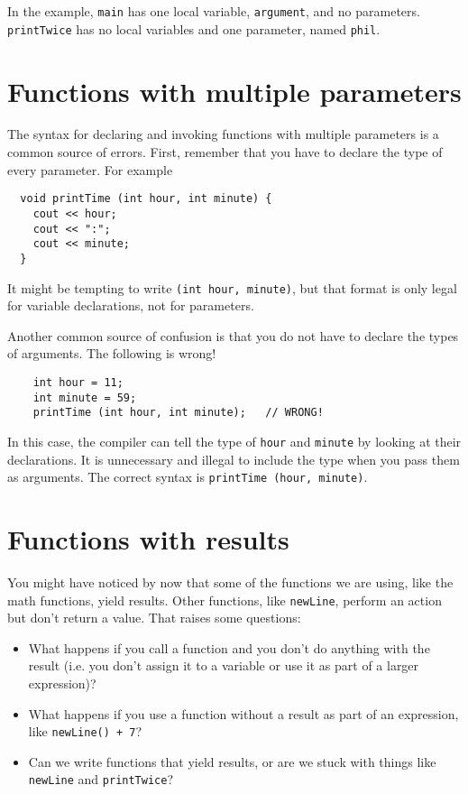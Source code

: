 In the example, {\tt main} has one local variable, {\tt argument}, and
no parameters.  {\tt printTwice} has no local variables and one
parameter, named {\tt phil}.

\section {Functions with multiple parameters}

The syntax for declaring and invoking functions with multiple
parameters is a common source of errors.  First, remember
that you have to declare the type of every parameter.  For
example

\begin{verbatim}
  void printTime (int hour, int minute) {
    cout << hour;
    cout << ":";
    cout << minute;
  }
\end{verbatim}
%
It might be tempting to write {\tt (int hour, minute)}, but
that format is only legal for variable declarations, not
for parameters.

Another common source of confusion is that you do not have
to declare the types of arguments.  The following is wrong!

\begin{verbatim}
    int hour = 11;
    int minute = 59;
    printTime (int hour, int minute);   // WRONG!
\end{verbatim}
%
In this case, the compiler can tell the type of {\tt hour}
and {\tt minute} by looking at their declarations.  It is
unnecessary and illegal to include the type when you pass them
as arguments.  The correct
syntax is {\tt printTime (hour, minute)}.

\section {Functions with results}

You might have noticed by now that some of the functions we are using,
like the math functions, yield results.  Other functions,
like {\tt newLine}, perform an action but
don't return a value.  That raises some questions:

\begin{itemize}

\item What happens if you call a function and you don't
do anything with the result (i.e. you don't assign it to
a variable or use it as part of a larger expression)?

\item What happens if you use a function without a result as part
of an expression, like {\tt newLine() + 7}?

\item Can we write functions that yield results, or are we
stuck with things like {\tt newLine} and {\tt printTwice}?

\end{itemize}

